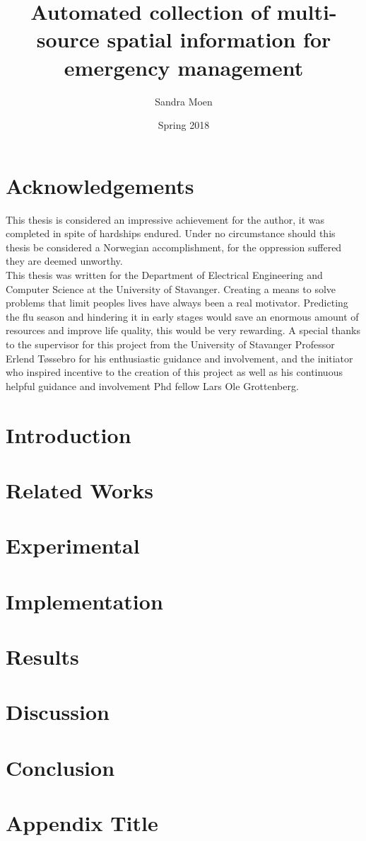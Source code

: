 \documentclass[12pt, twoside]{report}
\title{Automated collection of multi-source spatial information for emergency management}
\author{Sandra Moen}
\date{Spring 2018}
\begin{document}






\chapter*{Acknowledgements}
This thesis is considered an impressive achievement for the author, it was completed in spite of hardships endured. Under no circumstance should this thesis be considered a Norwegian accomplishment, for the oppression suffered they are deemed unworthy.
\newline \\
This thesis was written for the Department of Electrical Engineering and Computer Science at the University of Stavanger. Creating a means to solve  problems that limit peoples lives have always been a real motivator. Predicting the flu season and hindering it in early stages would save an enormous amount of resources and improve life quality, this would be very rewarding. A special thanks to the supervisor for this project from the University of Stavanger Professor Erlend Tøssebro for his enthusiastic guidance and involvement, and the initiator who inspired incentive to the creation of this project as well as his continuous helpful guidance and involvement Phd fellow Lars Ole Grottenberg.

\setcounter{secnumdepth}{5}
\setcounter{tocdepth}{5}
\tableofcontents
\listoffigures
\listoftables

\chapter{Introduction}


\chapter{Related Works}


\chapter{Experimental}


\chapter{Implementation}


\chapter{Results}


\chapter{Discussion}


\chapter{Conclusion}


\appendix
\chapter{Appendix Title}



\end{document}
